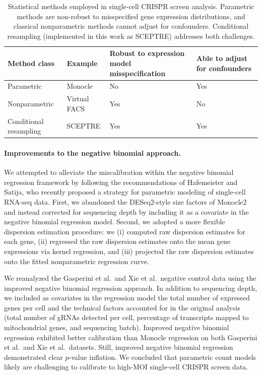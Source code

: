 \documentclass{article}
\begin{document}
\begin{table}
	\begin{tabular}{ | p{6em} p{7em} p{10em} p{8em} | } 
		\hline
		\textbf{Method class} & \textbf{Example}  & \textbf{Robust to expression model misspecification} & \textbf{Able to adjust for confounders} \\ 
		\hline
		Parametric & Monocle\cite{Qiu2017} & No & Yes \\ 
		\hline
		Nonparametric & Virtual FACS\cite{Xie2019} & Yes & No \\ 
		\hline
		Conditional resampling & SCEPTRE & Yes & Yes \\
		\hline
	\end{tabular}
	\caption{\label{summary_tab} Statistical methods employed in single-cell CRISPR screen analysis. Parametric methods are non-robust to misspecified gene expression distributions, and classical nonparametric methods cannot adjust for confounders. Conditional resampling (implemented in this work as SCEPTRE) addresses both challenges.}
\end{table}

\paragraph{Improvements to the negative binomial approach.} 

We attempted to alleviate the miscalibration within the negative binomial regression framework by following the recommendations of Hafemeister and Satija, who recently proposed a strategy for parametric modeling of single-cell RNA-seq data\cite{Hafemeister2019}. First, we abandoned the DESeq2-style size factors of Monocle2 and instead corrected for sequencing depth by including it as a covariate in the negative binomial regression model. Second, we adopted a more flexible dispersion estimation procedure: we (i) computed raw dispersion estimates for each gene, (ii) regressed the raw dispersion estimates onto the mean gene expressions via kernel regression, and (iii) projected the raw dispersion estimates onto the fitted nonparametric regression curve.

We reanalyzed the Gasperini et al.\ and Xie et al.\ negative control data using the improved negative binomial regression approach. In addition to sequencing depth, we included as covariates in the regression model the total number of expressed genes per cell and the technical factors accounted for in the original analysis (total number of gRNAs detected per cell, percentage of transcripts mapped to mitochondrial genes, and sequencing batch). Improved negative binomial regression exhibited better calibration than Monocle regression on both Gasperini et al.\ and Xie et al.\ datasets. Still, improved negative binomial regression demonstrated clear $p$-value inflation. We concluded that parametric count models likely are challenging to calibrate to high-MOI single-cell CRISPR screen data.
\end{document}
